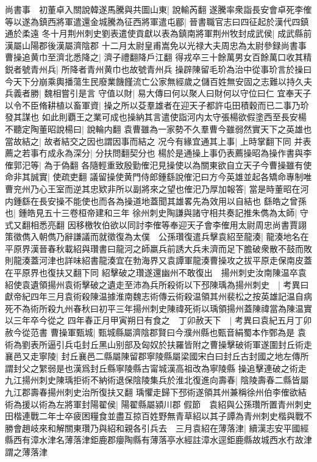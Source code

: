 尚書事　初董卓入關說韓遂馬騰與共圖山東|{
	說輸芮翻}
遂騰率衆詣長安會卓死李傕等以遂為鎮西將軍遣還金城騰為征西將軍遣屯郿|{
	晉書職官志曰四征起於漢代四鎮通於柔遠}
冬十月荆州刺史劉表遣使貢獻以表為鎮南將軍荆州牧封成武侯|{
	成武縣前漢屬山陽郡後漢屬濟陰郡}
十二月太尉皇甫嵩免以光禄大夫周忠為太尉參録尚書事曹操追黄巾至濟北悉降之|{
	濟子禮翻降戶江翻}
得戎卒三十餘萬男女百餘萬口收其精鋭者號青州兵|{
	所降者青州黄巾也故號青州兵}
操辟陳留毛玠為治中從事玠言於操曰今天下分崩乘輿播蕩生民廢業饑饉流亡公家無經歲之儲百姓無安固之志難以持久夫兵義者勝|{
	魏相嘗引是言}
守值以財|{
	易大傳曰何以聚人曰財何以守位曰仁}
宜奉天子以令不臣脩耕植以畜軍資|{
	操之所以芟羣雄者在迎天子都許屯田積穀而已二事乃玠發其謀也}
如此則覇王之業可成也操納其言遣使詣河内太守張楊欲假塗西至長安楊不聽定陶董昭說楊曰|{
	說輪内翻}
袁曹雖為一家勢不久羣曹今雖弱然實天下之英雄也當故結之|{
	故者結交之因也謂因事而結之}
况今有緣宜通其上事|{
	上時掌翻下同}
并表薦之若事冇成永為深分|{
	分扶問翻契分也}
楊於是通操上事仍表薦操昭為操作書與李傕郭汜等|{
	為于偽翻}
各隨輕重致殷勤傕汜見操使以為關東欲自立天子今曹操雖有使命非其誠實|{
	使疏吏翻}
議留操使黄門侍郎鍾繇說傕汜曰方今英雄並起各矯命專制唯曹兖州乃心王室而逆其忠欵非所以副將來之望也傕汜乃厚加報答|{
	當是時董昭在河内鍾繇在長安操不能使也而各為操道地蓋聞其雄畧先為效用以自結也}
繇皓之曾孫也|{
	鍾皓見五十三卷桓帝建和三年}
徐州刺史陶謙與諸守相共奏記推朱儁為太師|{
	守式又翻相悉亮翻}
因移檄牧伯欲以同討李傕等奉迎天子會李傕用太尉周忠尚書賈詡策徵儁入朝儁乃辭謙議而就徵復為太僕　公孫瓚復遣兵擊袁紹至龍湊|{
	龍湊地名在平原界漢晉春秋載紹與瓚書曰龍河之師羸兵前誘大兵未濟而足下膽破衆散不鼓而敗則龍湊蓋河津也詳味紹書龍湊宜在勃海界又袁譚軍龍湊曹操攻之拔平原走保南皮蓋在平原界也復扶又翻下同}
紹擊破之瓚遂還幽州不敢復出　揚州刺史汝南陳温卒袁紹使袁遺領揚州袁術擊破之遺走至沛為兵所殺術以下邳陳瑀為揚州刺史　|{
	考異曰獻帝紀四年三月袁術殺陳温據淮南魏志術傳云術殺温領其州裴松之按英雄記温自病死不為術所殺九州春秋曰初平三年揚州刺史陳禕死術以瑀領揚州蓋陳禕當為陳温實以三年卒今從之}
四年春正月甲寅朔日有食之　丁卯赦天下　|{
	考異曰袁紀五月丁卯赦今從范書}
曹操軍甄城|{
	甄城縣屬濟陰郡賢曰今濮州縣也甄音絹蜀本作鄄為是}
袁術為劉表所逼引兵屯封丘黑山别部及匈奴於扶羅皆附之曹操擊破術軍遂圍封丘術走襄邑又走寧陵|{
	封丘襄邑二縣屬陳留郡寧陵縣屬梁國宋白曰封丘古封國之地左傳所謂封父之䌓弱是也漢爲封丘縣寧陵縣古甯城漢高祖改為寧陵縣}
操追擊連破之術走九江揚州刺史陳瑀拒術不納術退保陰陵集兵於淮北復進向壽春|{
	陰陵壽春二縣皆屬九江郡壽春揚州刺史治所復扶又翻}
瑀懼走歸下邳術遂領其州兼稱徐州伯李傕欲結術為援以術為左將軍封陽翟侯|{
	陽翟縣屬潁川郡}
假節　袁紹與公孫瓚所置青州刺史田楷連戰二年士卒疲困糧食並盡互掠百姓野無青草紹以其子譚為青州刺史楷與戰不勝會趙岐來和解關東瓚乃與紹和親各引兵去　三月袁紹在薄落津|{
	續漢志安平國經縣西有漳水津名薄落津鉅鹿郡癭陶縣有薄落亭水經註漳水逕鉅鹿縣故城西水冇故津謂之薄落津}
